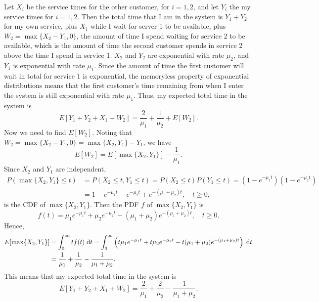 \documentclass{homework}
\begin{document}
	Let $X_i$ be the service times for the other customer, for $i=1,2$, and let $Y_i$ the my service times for $i=1,2$. Then the total time that I am in the system is $Y_1 + Y_2$ for my own service, plus $X_1$ while I wait for server 1 to be available, plus $W_2 = \max\{X_2 - Y_1, 0\}$, the amount of time I spend waiting for service 2 to be available, which is the amount of time the second customer spends in service 2 above the time I spend in service 1. $X_2$ and $Y_2$ are exponential with rate $\mu_2$, and $Y_1$ is exponential with rate $\mu_1$. Since the amount of time the first customer will wait in total for service 1 is exponential, the memoryless property of exponential distributions means that the first customer's time remaining from when I enter the system is still exponential with rate $\mu_1$. Thus, my expected total time in the system is
	\begin{equation*}
		E[Y_1 + Y_2 + X_1 + W_2] = \frac{2}{\mu_1} + \frac{1}{\mu_2} + E[W_2].
	\end{equation*}
	Now we need to find $E[W_2]$. Noting that $W_2 = \max\{X_2 - Y_1, 0\} = \max\{X_2, Y_1\} - Y_1$, we have
	\begin{equation*}
		E[W_2] = E[\max\{X_2, Y_1\}] - \frac{1}{\mu_1}.
	\end{equation*}
	Since $X_2$ and $Y_1$ are independent,
	\begin{align*}
		P(\max\{X_2, Y_1\} \le t) &= P(X_2 \le t, Y_1\le t) = P(X_2\le t)P(Y_1\le t) = (1- e^{-\mu_1t})(1-e^{-\mu_2t}) \\
		&= 1 - e^{-\mu_1 t} - e^{-\mu_2 t} + e^{-(\mu_1 + \mu_2)t}, \quad t \ge 0,
	\end{align*}
	is the CDF of $\max\{X_2, Y_1\}$. Then the PDF $f$ of $\max\{X_2, Y_1\}$ is
	\begin{equation*}
		f(t) = \mu_1e^{-\mu_1t} + \mu_2e^{-\mu_2t} - (\mu_1+\mu_2)e^{-(\mu_1+\mu_2)t}, \quad t \ge 0.
	\end{equation*}
	Hence,
	\begin{align*}
		E[\max\{X_2, Y_1\}] &= \int_0^\infty tf(t)\;\text{d} t = \int_0^\infty \left(t\mu_1e^{-\mu_1t} + t\mu_2e^{-\mu_2t} - t(\mu_1+\mu_2)e^{-(\mu_1+\mu_2)t}\right)\;\text{d} t \\
		&= \frac{1}{\mu_1} + \frac{1}{\mu_2} - \frac{1}{\mu_1 + \mu_2}.
	\end{align*}
	This means that my expected total time in the system is
	\begin{equation*}
		E[Y_1 + Y_2 + X_1 + W_2] = \frac{2}{\mu_1} + \frac{2}{\mu_2}-\frac{1}{\mu_1+\mu_2}.
	\end{equation*}
	
\end{document}

